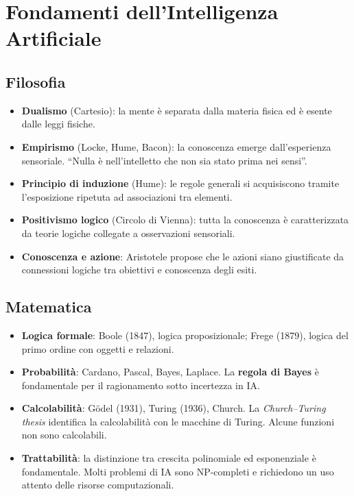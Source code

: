 \section{Fondamenti dell'Intelligenza Artificiale}
\subsection{Filosofia}
\begin{itemize}
    \item \textbf{Dualismo} (Cartesio): la mente \`e separata dalla materia fisica ed \`e esente dalle leggi fisiche.
    \item \textbf{Empirismo} (Locke, Hume, Bacon): la conoscenza emerge dall'esperienza sensoriale. ``Nulla \`e nell'intelletto che non sia stato prima nei sensi''.
    \item \textbf{Principio di induzione} (Hume): le regole generali si acquisiscono tramite l'esposizione ripetuta ad associazioni tra elementi.
    \item \textbf{Positivismo logico} (Circolo di Vienna): tutta la conoscenza \`e caratterizzata da teorie logiche collegate a osservazioni sensoriali.
    \item \textbf{Conoscenza e azione}: Aristotele propose che le azioni siano giustificate da connessioni logiche tra obiettivi e conoscenza degli esiti.
\end{itemize}


\subsection{Matematica}
\begin{itemize}
    \item \textbf{Logica formale}: Boole (1847), logica proposizionale; Frege (1879), logica del primo ordine con oggetti e relazioni.
    \item \textbf{Probabilit\`a}: Cardano, Pascal, Bayes, Laplace. La \textbf{regola di Bayes} \`e fondamentale per il ragionamento sotto incertezza in IA.
    \item \textbf{Calcolabilit\`a}: G\"odel (1931), Turing (1936), Church. La \emph{Church--Turing thesis} identifica la calcolabilit\`a con le macchine di Turing. Alcune funzioni non sono calcolabili.
    \item \textbf{Trattabilit\`a}: la distinzione tra crescita polinomiale ed esponenziale \`e fondamentale. Molti problemi di IA sono NP-completi e richiedono un uso attento delle risorse computazionali.
\end{itemize}



